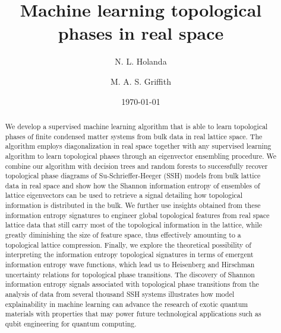 \documentclass[10pt]{revtex4-1}
\begin{document}
\nocite{*}

\title{Machine learning topological phases in real space}

\author{N. L. Holanda}

\author{M. A. S. Griffith}

\date{\today }

\begin{abstract}
We develop a supervised machine learning algorithm that is able to learn topological phases of finite condensed matter systems from bulk data in real lattice space. The algorithm employs diagonalization in real space together with any supervised learning algorithm to learn topological phases through an eigenvector ensembling procedure. We combine our algorithm with decision trees and random forests to successfully recover topological phase diagrams of Su-Schrieffer-Heeger (SSH) models from bulk lattice data in real space and show how the Shannon information entropy of ensembles of lattice eigenvectors can be used to retrieve a signal detailing how topological information is distributed in the bulk. We further use insights obtained from these information entropy signatures to engineer global topological features from real space lattice data that still carry most of the topological information in the lattice, while greatly diminishing the size of feature space, thus effectively amounting to a topological lattice compression. Finally, we explore the theoretical possibility of interpreting the information entropy topological signatures in terms of emergent information entropy wave functions, which lead us to Heisenberg and Hirschman uncertainty relations for topological phase transitions. The discovery of Shannon information entropy signals associated with topological phase transitions from the analysis of data from several thousand SSH systems illustrates how model explainability in machine learning can advance the research of exotic quantum materials with properties that may power future technological applications such as qubit engineering for quantum computing. 
\end{abstract}
\end{document}
